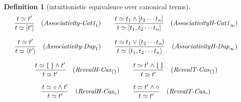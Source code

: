 \documentclass[12pt]{article}
\newtheorem{Definition}{Definition}[section]
\begin{document}
\begin{Definition}[intuitionistic equivalence over canonical terms]
\begin{displaymath}
\begin{array}{c}
      \begin{array}{rl}
        \begin{array}{rl}
          \dfrac{ t \simeq t' }{ t \simeq [t'] }
          & (\text{\it Associativity-Cat1}_1)
        \end{array}
        & \begin{array}{rl}
            \dfrac{
              t \simeq t_1 \wedge [t_2 \cdots t_n ]
            }{
              t \simeq [t_1, t_2 \cdots t_n ]
            }  &  (\text{\it AssociativityH-Cat1}_\infty)
          \end{array}
      \end{array}  \\
      \\

      \begin{array}{rl}
        \begin{array}{rl}
          \dfrac{ t \simeq t' }{ t \simeq \langle t' \rangle }
          & (\text{\it Associativity-Dup}_1)
        \end{array}
        & \begin{array}{rl}
            \dfrac{
              t \simeq t_1 \vee \langle t_2 \cdots t_n \rangle
            }{
              t \simeq \langle t_1, t_2 \cdots t_n \rangle
            }  &  (\text{\it AssociativityH-Dup}_\infty)
          \end{array}  \\
      \end{array}  \\
      \\
      
      \begin{array}{ll}
        \begin{array}{rl}
          \dfrac{ t \simeq \{\,\} \wedge t' }{
            t \simeq t'
          }  &  (\text{\it RevealH-Cas}_{\{\}})
        \end{array}
        & \begin{array}{rl}
            \dfrac{ t \simeq t' \wedge \{\,\} }{
              t \simeq t'
            }  &  (\text{\it RevealT-Cas}_{\{\}})
          \end{array}
      \end{array}  \\
      \\
      
      \begin{array}{ll}
        \begin{array}{rl}
          \dfrac{ t \simeq \circ \wedge t' }{
            t \simeq t'
          }  &  (\text{\it RevealH-Cas}_\circ)
        \end{array}
        & \begin{array}{rl}
            \dfrac{ t \simeq t' \wedge \circ }{
              t \simeq t'
            }  &  (\text{\it RevealT-Cas}_\circ)
          \end{array}
      \end{array}  \\
      \\
            

\end{array}
\end{displaymath}
\end{Definition}
\end{document}
